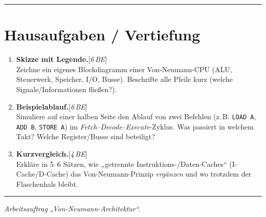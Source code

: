 \documentclass[11pt,a4paper]{scrartcl}
\newenvironment{aufgaben}{%
	\begin{enumerate}[leftmargin=*,label=\textbf{Aufgabe~\arabic*:}, itemsep=0.6em]
	}{\end{enumerate}}
\newcommand{\punkte}[1]{\hfill{\small[\textit{#1\,BE}]}}
\begin{document}
	\vspace{0.3em}
	\hrule
	\vspace{0.6em}
	
	\section*{Hausaufgaben / Vertiefung}
	
	\begin{aufgaben}
		\item \textbf{Skizze mit Legende.}\punkte{6}\\
		Zeichne ein eigenes Blockdiagramm einer Von-Neumann-CPU (ALU, Steuerwerk, Speicher, I/O, Busse). Beschrifte alle Pfeile kurz (welche Signale/Informationen fließen?).
		
		\item \textbf{Beispielablauf.}\punkte{6}\\
		Simuliere auf einer halben Seite den Ablauf von zwei Befehlen (z.\,B. \texttt{LOAD A}, \texttt{ADD B}, \texttt{STORE A}) im \emph{Fetch–Decode–Execute}-Zyklus. Was passiert in welchem Takt? Welche Register/Busse sind beteiligt?
		
		\item \textbf{Kurzvergleich.}\punkte{4}\\
		Erkläre in 5–6 Sätzen, wie „getrennte Instruktions-/Daten-Caches“ (I-Cache/D-Cache) das Von-Neumann-Prinzip \emph{ergänzen} und wo trotzdem der Flaschenhals bleibt.
	\end{aufgaben}
	
	\vfill
	\hrule
	\small\emph{Arbeitsauftrag „Von-Neumann-Architektur“.}
	
\end{document}
